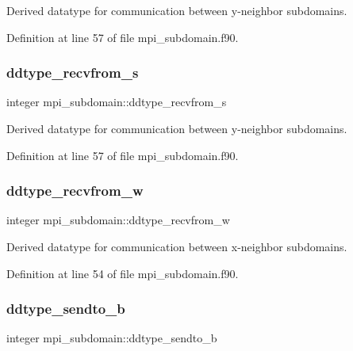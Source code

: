 Derived datatype for communication between y-\/neighbor subdomains. 



Definition at line 57 of file mpi\+\_\+subdomain.\+f90.

\mbox{\label{namespacempi__subdomain_a1f46916f08758533cad3ecac33233e38}} 
\subsubsection{\texorpdfstring{ddtype\_recvfrom\_s}{ddtype\_recvfrom\_s}}
{\footnotesize\ttfamily integer mpi\+\_\+subdomain\+::ddtype\+\_\+recvfrom\+\_\+s}



Derived datatype for communication between y-\/neighbor subdomains. 



Definition at line 57 of file mpi\+\_\+subdomain.\+f90.

\mbox{\label{namespacempi__subdomain_a0b2a4ab6d6a88a3817f473a5c2c172b9}} 
\subsubsection{\texorpdfstring{ddtype\_recvfrom\_w}{ddtype\_recvfrom\_w}}
{\footnotesize\ttfamily integer mpi\+\_\+subdomain\+::ddtype\+\_\+recvfrom\+\_\+w}



Derived datatype for communication between x-\/neighbor subdomains. 



Definition at line 54 of file mpi\+\_\+subdomain.\+f90.

\mbox{\label{namespacempi__subdomain_a7a2af0322a7aaa435951a5432859687a}} 
\subsubsection{\texorpdfstring{ddtype\_sendto\_b}{ddtype\_sendto\_b}}
{\footnotesize\ttfamily integer mpi\+\_\+subdomain\+::ddtype\+\_\+sendto\+\_\+b}



